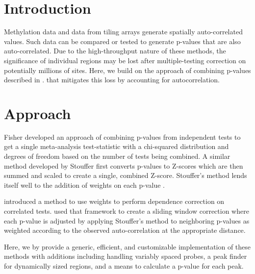\documentclass{bioinfo}
\begin{document}
\section{Introduction}
Methylation data and data from tiling arrays generate spatially auto-correlated
values. Such data can be compared or tested to generate p-values that are also
auto-correlated. Due to the high-throughput nature of these methods, the
significance of individual regions may be lost after multiple-testing correction
on potentially millions of sites. Here, we build on the approach of combining
p-values described in \citealp{Kechris2010}.  that mitigates this loss by
accounting for autocorrelation.
\section{Approach}
Fisher \citep{Fisher} developed an approach of combining p-values from independent tests
to get a single meta-analysis test-statistic with a chi-squared distribution
and degrees of freedom based on the number of tests being combined.
A similar method developed by Stouffer \citep{Stouffer} first converts p-values
to Z-scores which are then summed and scaled to create a single, combined Z-score.
Stouffer's method lends itself well to the addition of weights on each p-value
\citep{Liptak}.

\citealp{Zaykin2002} introduced a method to use weights to perform dependence
correction on correlated tests. \citealp{Kechris2010} used that framework to create
a sliding window correction where each p-value is adjusted by
applying Stouffer's method to neighboring p-values as weighted according to the
observed auto-correlation at the appropriate distance.

Here, we by provide a generic, efficient, and customizable implementation
of these methods with additions including handling variably spaced probes,
a peak finder for dynamically sized regions, and a means to calculate a
p-value for each peak.
\end{document}
